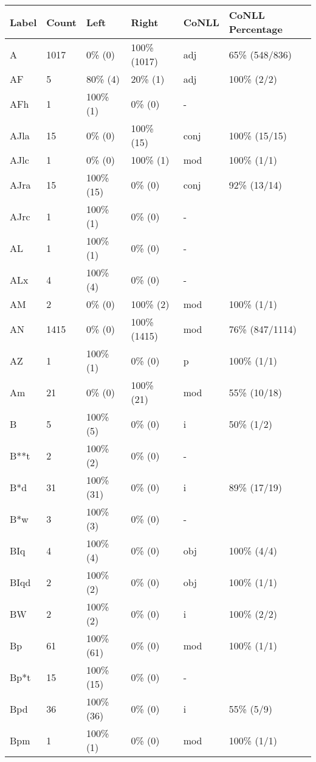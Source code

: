 \begin{figure*}
\begin{tabular}{|l|l|l|l||l|l|}
\hline
Label & Count & Left & Right & CoNLL & CoNLL Percentage\\ 
\hline
 A & 1017 & 0\% (0) & 100\% (1017) & adj & 65\% (548/836) \\ 
\hline
 AF & 5 & 80\% (4) & 20\% (1) & adj & 100\% (2/2) \\ 
\hline
 AFh & 1 & 100\% (1) & 0\% (0) & - &  \\ 
\hline
 AJla & 15 & 0\% (0) & 100\% (15) & conj & 100\% (15/15) \\ 
\hline
 AJlc & 1 & 0\% (0) & 100\% (1) & mod & 100\% (1/1) \\ 
\hline
 AJra & 15 & 100\% (15) & 0\% (0) & conj & 92\% (13/14) \\ 
\hline
 AJrc & 1 & 100\% (1) & 0\% (0) & - &  \\ 
\hline
 AL & 1 & 100\% (1) & 0\% (0) & - &  \\ 
\hline
 ALx & 4 & 100\% (4) & 0\% (0) & - &  \\ 
\hline
 AM & 2 & 0\% (0) & 100\% (2) & mod & 100\% (1/1) \\ 
\hline
 AN & 1415 & 0\% (0) & 100\% (1415) & mod & 76\% (847/1114) \\ 
\hline
 AZ & 1 & 100\% (1) & 0\% (0) & p & 100\% (1/1) \\ 
\hline
 Am & 21 & 0\% (0) & 100\% (21) & mod & 55\% (10/18) \\ 
\hline
 B & 5 & 100\% (5) & 0\% (0) & i & 50\% (1/2) \\ 
\hline
 B**t & 2 & 100\% (2) & 0\% (0) & - &  \\ 
\hline
 B*d & 31 & 100\% (31) & 0\% (0) & i & 89\% (17/19) \\ 
\hline
 B*w & 3 & 100\% (3) & 0\% (0) & - &  \\ 
\hline
 BIq & 4 & 100\% (4) & 0\% (0) & obj & 100\% (4/4) \\ 
\hline
 BIqd & 2 & 100\% (2) & 0\% (0) & obj & 100\% (1/1) \\ 
\hline
 BW & 2 & 100\% (2) & 0\% (0) & i & 100\% (2/2) \\ 
\hline
 Bp & 61 & 100\% (61) & 0\% (0) & mod & 100\% (1/1) \\ 
\hline
 Bp*t & 15 & 100\% (15) & 0\% (0) & - &  \\ 
\hline
 Bpd & 36 & 100\% (36) & 0\% (0) & i & 55\% (5/9) \\ 
\hline
 Bpm & 1 & 100\% (1) & 0\% (0) & mod & 100\% (1/1) \\ 

\end{tabular}
\end{figure*}
